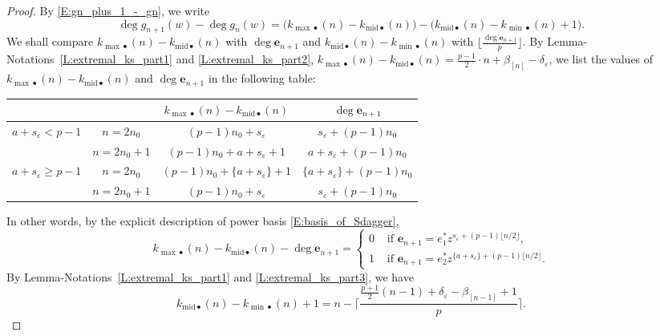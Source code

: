 \begin{proof}
    By \eqref{E:gn_plus_1_-_gn}, we write
    $$
    \deg g_{n+1}(w) - \deg g_n(w) = \big(k_{{\max}\bullet}(n) - k_{{\mathrm{mid}}\bullet}(n)\big) - \big(k_{{\mathrm{mid}}\bullet}(n) -  k_{{\min}\bullet}(n)+1 \big).$$
    We shall compare $k_{{\max}\bullet}(n)-k_{{\mathrm{mid}}\bullet}(n)$ with $\deg {\mathbf{e}}_{n+1}$ and   $k_{{\mathrm{mid}}\bullet}(n)-k_{{\min}\bullet}(n)$ with $\lfloor \frac{\deg{\mathbf{e}}_{n+1}}{p} \rfloor$.
    By Lemma-Notations~\ref{L:extremal_ks_part1} and \ref{L:extremal_ks_part2},  $k_{{\max}\bullet}(n)-k_{{\mathrm{mid}}\bullet}(n)=\frac{p-1}{2}\cdot n+\beta_{[n]}-\delta_{\varepsilon}$, we list the values of $k_{{\max}\bullet}(n)-k_{{\mathrm{mid}}\bullet}(n)$ and $\deg {\mathbf{e}}_{n+1}$ in the following table:
    \begin{center}
    \begin{tabular}{|c|c|c|c|}
    \hline
     & &$k_{{\max} \bullet}(n)-k_{{\mathrm{mid}}\bullet}(n)$ & $\deg {\mathbf{e}}_{n+1}$
    \\
    \hline
    $a+s_\varepsilon < p-1$ & $n=2n_0$ & $(p-1)n_0+s_\varepsilon$& $s_\varepsilon+(p-1)n_0$
    \\
    \cline{2-4}
    & $n=2n_0+1$ &  $(p-1)n_0+a+s_\varepsilon+1$ & $a+s_\varepsilon+(p-1)n_0$
    \\
    \hline
    $a+s_\varepsilon \geq p-1$ & $n=2n_0$ &$(p-1)n_0+\{a+s_\varepsilon\}+1$ & $\{a+s_\varepsilon\}+(p-1)n_0$
    \\
    \cline{2-4} & $n=2n_0+1$ & $(p-1)n_0+s_\varepsilon$ & $s_\varepsilon+(p-1)n_0$
    \\
    \hline
    \end{tabular}
    \end{center}
    In other words, by the explicit description of power basis \eqref{E:basis_of_Sdagger},
    \begin{equation}
    \label{E:kmax-kmid}
    k_{\max {\bullet}}(n) - k_{{\mathrm{mid}}\bullet}(n)  - \deg {\mathbf{e}}_{n+1} = \begin{cases}
    0& \textrm{ if }{\mathbf{e}}_{n+1} = e_1^*z^{s_\varepsilon+ (p-1)\lfloor n/2\rfloor},
    \\
    1 & \textrm{ if }{\mathbf{e}}_{n+1} = e_2^*z^{\{a+s_\varepsilon\}+ (p-1)\lfloor n/2\rfloor}.
    \end{cases}
    \end{equation}
    By Lemma-Notations~\ref{L:extremal_ks_part1} and \ref{L:extremal_ks_part3}, we have
    $$
    k_{{{\mathrm{mid}}}\bullet}(n)-k_{{\min} \bullet}(n)+1=n-\Big\lceil \frac{\frac{p+1}{2}(n-1)+\delta_\varepsilon-\beta_{[n-1]}+1}{p}\Big\rceil.$$

\end{proof}
